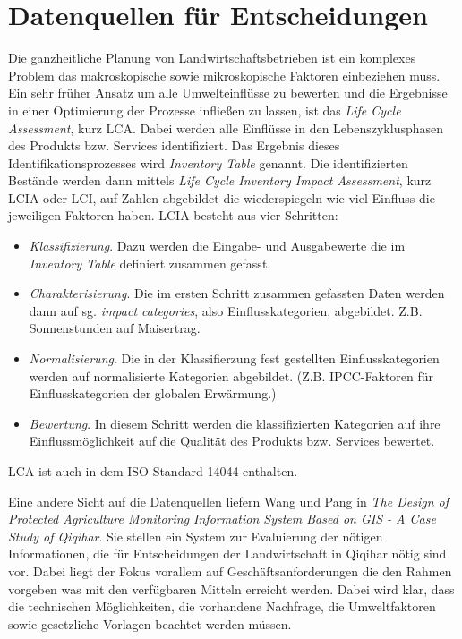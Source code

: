 \section{Datenquellen für Entscheidungen}

Die ganzheitliche Planung von Landwirtschaftsbetrieben ist ein komplexes Problem das makroskopische sowie mikroskopische Faktoren einbeziehen muss. Ein sehr früher Ansatz um alle Umwelteinflüsse zu bewerten und die Ergebnisse in einer Optimierung der Prozesse infließen zu lassen, ist das \textit{Life Cycle Assessment}, kurz LCA. Dabei werden alle Einflüsse in den Lebenszyklusphasen des Produkts bzw. Services identifiziert. Das Ergebnis dieses Identifikationsprozesses wird \textit{Inventory Table} genannt. Die identifizierten Bestände werden dann mittels \textit{Life Cycle Inventory Impact Assessment}, kurz LCIA oder LCI, auf Zahlen abgebildet die wiederspiegeln wie viel Einfluss die jeweiligen Faktoren haben. LCIA besteht aus vier Schritten:\cite{jour:Klopffer1997}

\begin{itemize}
	\item \textit{Klassifizierung}. Dazu werden die Eingabe- und Ausgabewerte die im \textit{Inventory Table} definiert zusammen gefasst.
	\item \textit{Charakterisierung}. Die im ersten Schritt zusammen gefassten Daten werden dann auf sg. \textit{impact categories}, also Einflusskategorien, abgebildet. Z.B. Sonnenstunden auf Maisertrag.
	\item \textit{Normalisierung}. Die in der Klassifierzung fest gestellten Einflusskategorien werden auf normalisierte Kategorien abgebildet. (Z.B. IPCC-Faktoren für Einflusskategorien der globalen Erwärmung.)
	\item \textit{Bewertung}. In diesem Schritt werden die klassifizierten Kategorien auf ihre Einflussmöglichkeit auf die Qualität des Produkts bzw. Services bewertet.
\end{itemize}

LCA ist auch in dem ISO-Standard 14044 enthalten.\cite{jour:Klopffer1997}

Eine andere Sicht auf die Datenquellen liefern Wang und Pang in \textit{The Design of Protected Agriculture Monitoring Information System
Based on GIS - A Case Study of Qiqihar}. Sie stellen ein System zur Evaluierung der nötigen Informationen, die für Entscheidungen der Landwirtschaft in Qiqihar nötig sind vor. Dabei liegt der Fokus vorallem auf Geschäftsanforderungen die den Rahmen vorgeben was mit den verfügbaren Mitteln erreicht werden. Dabei wird klar, dass die technischen Möglichkeiten, die vorhandene Nachfrage, die Umweltfaktoren sowie gesetzliche Vorlagen beachtet werden müssen. \cite{jour:Wang2013}

